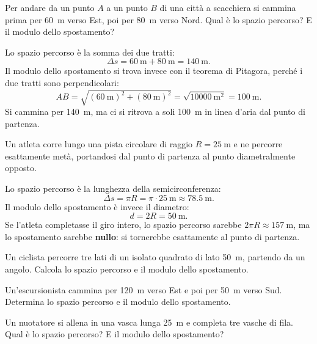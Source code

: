 \begin{testexample}
Per andare da un punto $A$ a un punto $B$ di una città a scacchiera si cammina prima per \SI{60}{\metre} verso Est, poi per \SI{80}{\metre} verso Nord. Qual è lo spazio percorso? E il modulo dello spostamento?

Lo spazio percorso è la somma dei due tratti:
\[ \Delta s = \SI{60}{\metre} + \SI{80}{\metre} = \SI{140}{\metre}. \]
Il modulo dello spostamento si trova invece con il teorema di Pitagora, perché i due tratti sono perpendicolari:
\[ AB = \sqrt{(\SI{60}{\metre})^2 + (\SI{80}{\metre})^2} = \sqrt{\SI{10000}{\metre\squared}} = \SI{100}{\metre}. \]
Si cammina per \SI{140}{\metre}, ma ci si ritrova a soli \SI{100}{\metre} in linea d'aria dal punto di partenza.
\end{testexample}

\begin{testexample}
Un atleta corre lungo una pista circolare di raggio $R = \SI{25}{\metre}$ e ne percorre esattamente metà, portandosi dal punto di partenza al punto diametralmente opposto.

Lo spazio percorso è la lunghezza della semicirconferenza:
\[ \Delta s = \pi R = \pi \cdot \SI{25}{\metre} \approx \SI{78,5}{\metre}. \]
Il modulo dello spostamento è invece il diametro:
\[ d = 2R = \SI{50}{\metre}. \]
Se l'atleta completasse il giro intero, lo spazio percorso sarebbe $2\pi R \approx \SI{157}{\metre}$, ma lo spostamento sarebbe \textbf{nullo}: si tornerebbe esattamente al punto di partenza.
\end{testexample}

\begin{esercizio}
Un ciclista percorre tre lati di un isolato quadrato di lato \SI{50}{\metre}, partendo da un angolo. Calcola lo spazio percorso e il modulo dello spostamento.\\
\end{esercizio}

\begin{esercizio}
Un'escursionista cammina per \SI{120}{\metre} verso Est e poi per \SI{50}{\metre} verso Sud. Determina lo spazio percorso e il modulo dello spostamento.\\
\end{esercizio}

\begin{esercizio}
Un nuotatore si allena in una vasca lunga \SI{25}{\metre} e completa tre vasche di fila. Qual è lo spazio percorso? E il modulo dello spostamento?\\
\end{esercizio}

